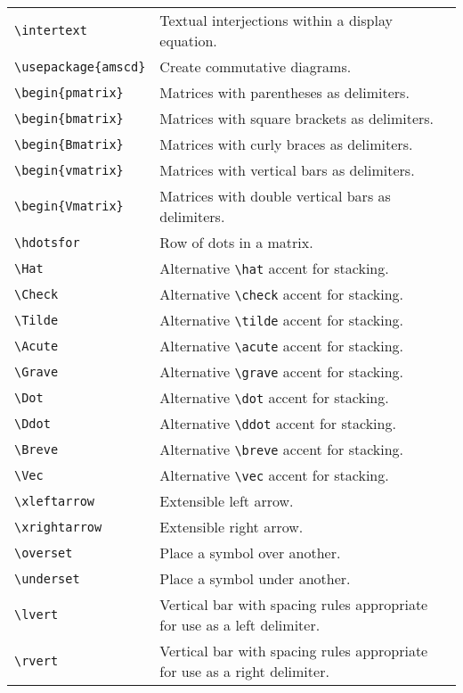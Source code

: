 \documentclass[%
twocolumn,secnumarabic,amssymb, amsmath, nofootinbib,tightenlines,
nobibnotes, aps, 
prl,
]{revtex4-2}
\begin{document}
\begin{longtable*}{@{\extracolsep{0in}}p{3in}p{4in}}
\verb+\intertext+ & Textual interjections within a display equation.\\
\verb+\usepackage{amscd}+ & Create commutative diagrams.\\
\verb+\begin{pmatrix}+ & Matrices with parentheses as delimiters.\\
\verb+\begin{bmatrix}+ & Matrices with square brackets as delimiters.\\
\verb+\begin{Bmatrix}+ & Matrices with curly braces as delimiters.\\
\verb+\begin{vmatrix}+ & Matrices with vertical bars as delimiters.\\
\verb+\begin{Vmatrix}+ & Matrices with double vertical bars as
delimiters.\\
\verb+\hdotsfor+ & Row of dots in a matrix.\\
\verb+\Hat+ & Alternative \verb+\hat+ accent for stacking.\\
\verb+\Check+ & Alternative \verb+\check+ accent for stacking.\\
\verb+\Tilde+ & Alternative \verb+\tilde+ accent for stacking.\\
\verb+\Acute+ & Alternative \verb+\acute+ accent for stacking.\\
\verb+\Grave+ & Alternative \verb+\grave+ accent for stacking.\\
\verb+\Dot+ & Alternative \verb+\dot+ accent for stacking.\\
\verb+\Ddot+ & Alternative \verb+\ddot+ accent for stacking.\\
\verb+\Breve+ & Alternative \verb+\breve+ accent for stacking.\\
\verb+\Vec+ & Alternative \verb+\vec+ accent for stacking.\\
\verb+\xleftarrow+ & Extensible left arrow.\\
\verb+\xrightarrow+ & Extensible right arrow.\\
\verb+\overset+ & Place a symbol over another.\\
\verb+\underset+ & Place a symbol under another.\\
\verb+\lvert+ & Vertical bar with spacing rules appropriate for use as
a left delimiter.\\
\verb+\rvert+ & Vertical bar with spacing rules appropriate for use as
a right delimiter.\\

\end{longtable*}
\end{document}

